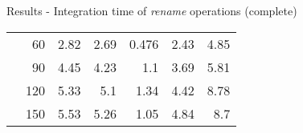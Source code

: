 \begin{frame}{Results - Integration time of \emph{rename} operations (complete)}
\begin{table}[!ht]
{\begin{tabular}{lrrrrrr}
                & 60  & 2.82 &   2.69 &  0.476 &       2.43 &        4.85 \\
                & 90  & 4.45 &   4.23 &    1.1 &       3.69 &        5.81 \\
                & 120 & 5.33 &    5.1 &   1.34 &       4.42 &        8.78 \\
                & 150 & 5.53 &   5.26 &   1.05 &       4.84 &         8.7 \\
            \bottomrule
          \end{tabular}
        }
    \end{table}
\end{frame}

